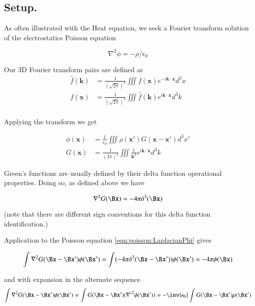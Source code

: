 \subsection{Setup. }

As often illustrated with the Heat equation, we seek a Fourier transform solution of the electrostatics Poisson equation

\begin{equation}\label{eqn:poisson:LaplacianPhi}
\nabla^2 \phi = -\rho/\epsilon_0
\end{equation}

Our 3D Fourier transform pairs are defined as
\begin{align*}
\hat{f}(\mathbf{k}) &= \frac{1}{(\sqrt{2\pi})^3} \iiint f(\mathbf{x}) e^{-i \mathbf{k} \cdot \mathbf{x} } d^3 x \\
{f}(\mathbf{x}) &= \frac{1}{(\sqrt{2\pi})^3} \iiint \hat{f}(\mathbf{k}) e^{i \mathbf{k} \cdot \mathbf{x} } d^3 k \\
\end{align*}

Applying the transform we get

\begin{align}\label{eqn:poisson:poissonSolution}
\phi(\mathbf{x}) &= \frac{1}{\epsilon_0} \iiint \rho(\mathbf{x}') G(\mathbf{x-x'}) d^3 x' \\
G(\mathbf{x}) &= \frac{1}{(2 \pi)^3} \iiint \frac{1}{\mathbf{k}^2} e^{ i \mathbf{k} \cdot \mathbf{x} } d^3 k
\end{align}

Green's functions are usually defined by their delta function operational properties.  Doing so, as defined above we have

\begin{equation}\label{eqn:poisson:greens}
\nabla^2 G(\Bx) = - 4 \pi \delta^3(\Bx)
\end{equation}

(note that there are different sign conventions for this delta function identification.)

Application to the Poisson equation \ref{eqn:poisson:LaplacianPhi} gives

\begin{equation}\label{eqn:poisson:10}
\int \nabla^2 G(\Bx - \Bx') \phi(\Bx') = \int (- 4 \pi \delta^3(\Bx - \Bx')) \phi(\Bx') = - 4 \pi \phi(\Bx)
\end{equation}

and with expansion in the alternate sequence
\begin{equation}\label{eqn:poisson:20}
\int \nabla^2 G(\Bx - \Bx') \phi(\Bx') = \int G(\Bx - \Bx') ({\nabla'}^2 \phi(\Bx')) = -\inv{\epsilon_0}\int G(\Bx - \Bx') \rho(\Bx')
\end{equation}

